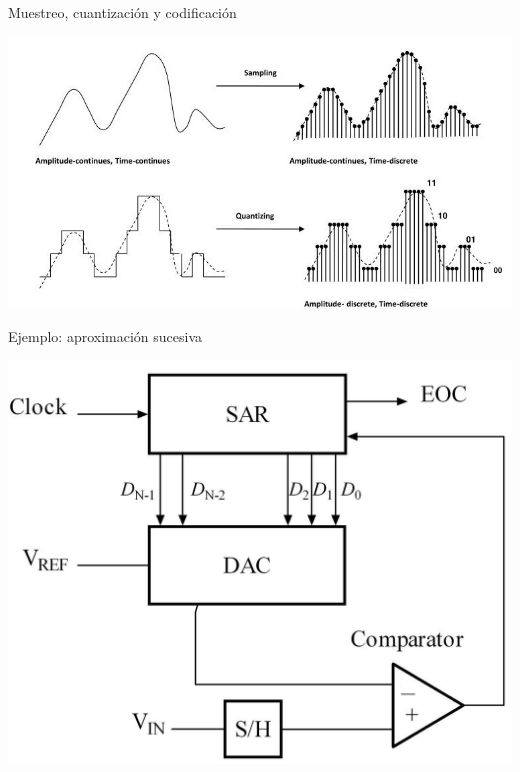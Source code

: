 \documentclass[aspectratio=169]{beamer}
\begin{document}
\begin{frame}{Muestreo, cuantización y codificación}
\begin{center}
    \includegraphics[width=0.9\linewidth]{presentaciones/fig/muestreo.jpg}
\end{center}
\end{frame}

\begin{frame}{Ejemplo: aproximación sucesiva}
\begin{center}
    \includegraphics[width=0.5\linewidth]{presentaciones/fig/SAR.png}
\end{center}
\end{frame}
\end{document}
